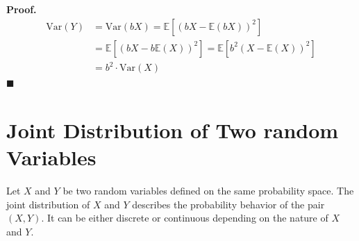 \documentclass[twoside]{book}
\begin{document}
\textbf{Proof.}
\begin{align*}
    \mathrm{Var}(Y) &= \mathrm{Var}(bX) = \mathbb{E}[(bX - \mathbb{E}(bX))^2]\\
&= \mathbb{E}[(bX - b\mathbb{E}(X))^2]
= \mathbb{E}[b^2 (X - \mathbb{E}(X))^2]\\
&= b^2 \cdot \mathrm{Var}(X)
\end{align*}
\hfill\(\blacksquare\)


\section{Joint Distribution of Two random Variables}
Let \( X \) and \( Y \) be two random variables defined on the same probability space. The joint distribution of \( X \) and \( Y \) describes the probability behavior of the pair \( (X, Y) \). It can be either discrete or continuous depending on the nature of \( X \) and \( Y \).
\end{document}
